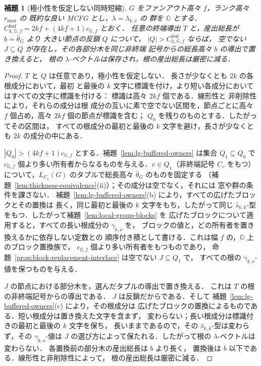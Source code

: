 \documentclass[11pt,a4paper]{ltjsarticle}
\numberwithin{equation}{section}
\theoremstyle{plain}
\newtheorem{lemma}[theorem]{補題}
\theoremstyle{definition}
\theoremstyle{remark}
\theoremstyle{plain}
\begin{document}
\begin{lemma}[極小性を仮定しない同時短縮]
\label{lem:lg-unconditional-shortening}
$G$ をファンアウト高々 $f$，ランク高々 $r_{\max}$ の
既約な良い MCFG とし，$\lambda=\lambda_{k,\nu}$ の
群を $\mathbb G$ とする．
$C^{\mathrm{buf}}_{k,\mathbb G,f}=2kf+(4kf+1)c_{\mathbb G,f}$ とおく．
任意の終端導出 $T$ と，産出総長が $b=\bar\theta_G$ より
大きい節点の反鎖 $Q$ について，
$|Q|>C^{\mathrm{buf}}_{k,\mathbb G,f}$ ならば，
空でない $J\subseteq Q$ が存在し，その各部分木を同じ非終端
記号からの総長高々 $b$ の導出で置き換えると，
根の $\lambda$-ベクトルは保存され，根の産出総長は厳密に減る．
\end{lemma}

\begin{proof}
$T$ と $Q$ は任意であり，極小性を仮定しない．
長さが少なくとも $2k$ の各根成分において，最初
と最後の $k$ 文字に標識を付け，より短い各成分においてはすべての文字に標識を付ける：
標識は高々 $2kf$ 個である．線形性と
非削除性により，それらの成分は根
成分の互いに素で空でない区間を，節点ごとに高々 $f$ 個占め，高々 $2kf$ 個の節点が標識を含む；
$Q_0$ を残りのものとする．したがってその区間は，
すべての根成分の最初と最後の $k$ 文字を避け，長さが少なくとも $2k$ の成分の中にある．

$|Q_0|>(4kf+1)c_{{\mathbb G},f}$ とする．補題~\ref{lem:lg-buffered-owners} は集合
$Q_1\subseteq Q_0$ で $c_{{\mathbb G},f}$ 個より多い所有者からなるものを与える．$v\in Q_1$（非終端記号
$C_v$ をもつ）について，$L_{C_v}(G)$ のタプルで総長高々 $\bar\theta_G$ のものを固定する
（補題~\ref{lem:thickness-equivalence}(ii)）；その成分は空でなく，それには
窓や群の条件を課さない．
補題~\ref{lem:lg-buffered-owners}(b) により，すべての広げたブロックとその置換は
長く，同じ最初と最後の $k$ 文字をもち，したがって同じ
$\widehat s_{k,k}$-型をもつ．したがって補題~\ref{lem:local-group-blocks} を
広げたブロックについて適用すると，すべての長い根成分の $\gamma_{k,\nu}$ を，
ブロックの値と，どの所有者を置き換えるかに依存しない定数との
順序付き積として書ける．これは幅 $f$ の，${\mathbb G}$ 上のブロック置換族で，
$c_{{\mathbb G},f}$ 個より多い所有者をもつものであり，
命題~\ref{prop:block-replacement-interface} は空でない $J\subseteq Q_1$ で，
すべての根の $\gamma_{k,\nu}$-値を保つものを与える．

$J$ の節点における部分木を，選んだタプルの導出で置き換える．
これは $T$ の根の非終端記号からの導出である．
$J$ は反鎖だからである．そして
補題~\ref{lem:lg-buffered-owners}(c) により，その根成分は
広げたブロックの置換によるものである．短い根成分は置き換えた文字を含まず，
変わらない；長い根成分は標識付きの最初と最後の $k$ 文字を保ち，
長いままであるので，その $\widehat s_{k,k}$-型は変わらず，その
$\gamma_{k,\nu}$-値は $J$ の選び方によって保たれる．したがって根の
$\lambda$-ベクトルは変わらない．
各置換前の部分木の産出総長は $b$ より長く，
置換後は $b$ 以下である．線形性と非削除性によって，
根の産出総長は厳密に減る．
\end{proof}
\end{document}
